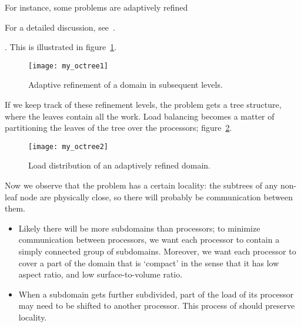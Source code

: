 For instance, some problems are adaptively
refined
\begin{footnoteenv}
  {For a detailed
    discussion, see~\cite{Campbell:octree}.}
\end{footnoteenv}
. This is illustrated in
figure~\ref{fig:octree1}.
\begin{figure}[ht]
  \texttt{[image: my\_octree1]}
  \caption{Adaptive refinement of a domain in subsequent levels.}
  \label{fig:octree1}
\end{figure}
If we keep track of these refinement levels, the problem gets a tree
structure, where the leaves contain all the work.
Load balancing becomes a matter of partitioning the leaves of the
tree over the processors; figure~\ref{fig:octree2}.
\begin{figure}[ht]
  \texttt{[image: my\_octree2]}
  \caption{Load distribution of an adaptively refined domain.}
  \label{fig:octree2}
\end{figure}
Now we observe that the problem has a certain locality: the subtrees
of any non-leaf node are physically close, so there will probably be
communication between them. 
\begin{itemize}
\item Likely there will be more subdomains than processors; to
  minimize communication between processors, we want each processor to
  contain a simply connected group of subdomains. Moreover, we want
  each processor to cover a part of the domain that is `compact' in
  the sense that it has low aspect ratio, and low surface-to-volume
  ratio.
\item When a subdomain gets further subdivided, part of the load of
  its processor may need to be shifted to another processor. This
  process of  should preserve
  locality.
\end{itemize}

